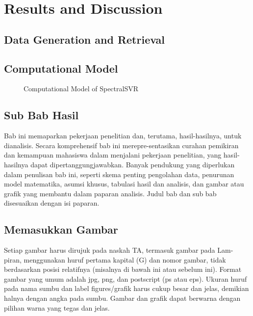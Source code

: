 \chapter{Results and Discussion}

\section{Data Generation and Retrieval}

\section{Computational Model}
\noindent

\begin{figure}
    \centering
    \begin{adjustbox}{width=\textwidth}
    \end{adjustbox}
    \caption{Computational Model of SpectralSVR}\label{fig:computational_model}
\end{figure}

\section{Sub Bab Hasil}
\noindent Bab ini memaparkan pekerjaan penelitian dan, terutama, hasil-hasilnya, untuk dianalisis. Secara komprehensif bab ini merepre-sentasikan curahan pemikiran dan kemampuan mahasiswa dalam menjalani pekerjaan penelitian, yang hasil-hasilnya dapat dipertanggungjawabkan. Banyak pendukung yang diperlukan dalam penulisan bab ini, seperti skema penting pengolahan data, penurunan model matematika, asumsi khusus, tabulasi hasil dan analisis, dan gambar atau grafik yang membantu dalam paparan analisis. Judul bab dan sub bab disesuaikan dengan isi paparan.

\section{Memasukkan Gambar}
\noindent Setiap gambar harus dirujuk pada naskah TA, termasuk gambar pada Lam- piran, menggunakan huruf pertama kapital (G) dan nomor gambar, tidak berdasarkan posisi relatifnya (misalnya di bawah ini atau sebelum ini). Format gambar yang umum adalah jpg, png, dan postscript (ps atau eps). Ukuran huruf pada nama sumbu dan label figures/grafik harus cukup besar dan jelas, demikian halnya dengan angka pada sumbu. Gambar dan grafik dapat berwarna dengan pilihan warna yang tegas dan jelas.


